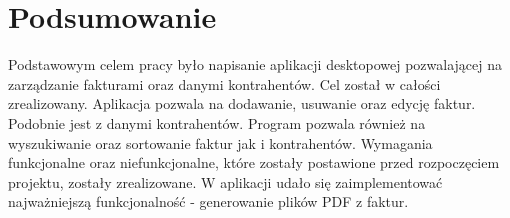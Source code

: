 \chapter{Podsumowanie}
Podstawowym celem pracy było napisanie aplikacji desktopowej pozwalającej na zarządzanie fakturami oraz danymi kontrahentów. Cel został w całości zrealizowany. Aplikacja pozwala na dodawanie, usuwanie oraz edycję faktur. Podobnie jest z danymi kontrahentów. Program pozwala również na wyszukiwanie oraz sortowanie faktur jak i kontrahentów. Wymagania funkcjonalne oraz niefunkcjonalne, które zostały postawione przed rozpoczęciem projektu, zostały zrealizowane. W aplikacji udało się zaimplementować najważniejszą funkcjonalność - generowanie plików PDF z faktur.
